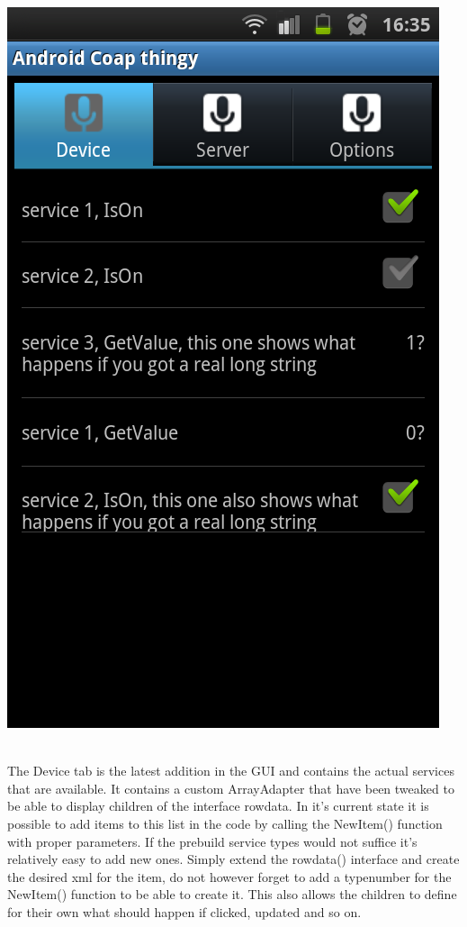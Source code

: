 \begin{center}
\includegraphics[scale=0.25]{android-device.png}%
\end{center}
\\The Device tab is the latest addition in the GUI and contains the actual services that are available. It contains a custom ArrayAdapter that have been tweaked to be able to display children of the interface rowdata.
In it's current state it is possible to add items to this list in the code by calling the NewItem() function with proper parameters. If the prebuild service types would not suffice it's relatively easy to add new ones.
Simply extend the rowdata() interface and create the desired xml for the item, do not however forget to add a typenumber for the NewItem() function to be able to create it. 
This also allows the children to define for their own what should happen if clicked, updated and so on.


